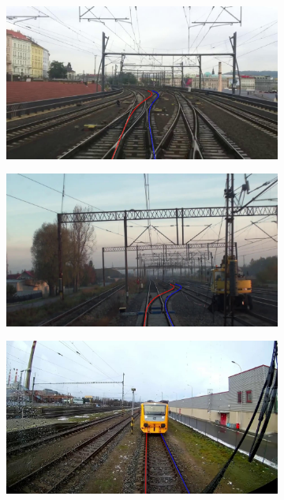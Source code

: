 \begin{figure}[htbp]
    \begin{subfigure}{0.328\textwidth}
        \includegraphics[width=\linewidth]{PICs/annotated_rs00007.jpg}
    \end{subfigure}
    \hfill
    \begin{subfigure}{0.328\textwidth}
        \includegraphics[width=\linewidth]{PICs/annotated_rs00107.jpg}
    \end{subfigure}
    \hfill
    \begin{subfigure}{0.328\textwidth}
        \includegraphics[width=\linewidth]{PICs/annotated_rs00244.jpg}
    \end{subfigure}


\end{figure}
